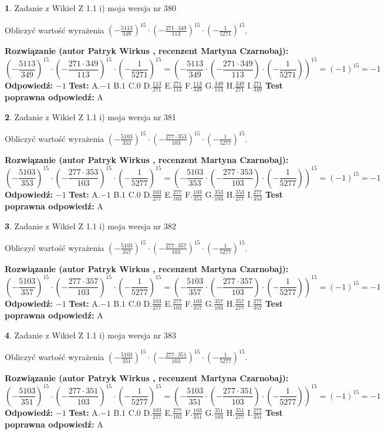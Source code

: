 \documentclass[12pt, a4paper]{article}
\theoremstyle{definition} %
\newtheorem{zad}{}
\newcommand{\zadStart}[1]{\begin{zad}#1\newline}
\newcommand{\zadStop}{\end{zad}}
\newcommand{\rozwStart}[2]{\noindent \textbf{Rozwiązanie (autor #1 , recenzent #2): }\newline}
\newcommand{\rozwStop}{\newline}
\newcommand{\odpStart}{\noindent \textbf{Odpowiedź:}\newline}
\newcommand{\odpStop}{\newline}
\newcommand{\testStart}{\noindent \textbf{Test:}\newline}
\newcommand{\testStop}{\newline}
\newcommand{\kluczStart}{\noindent \textbf{Test poprawna odpowiedź:}\newline}
\newcommand{\kluczStop}{\newline}
\begin{document}
\zadStart{Zadanie z Wikieł Z 1.1 i) moja wersja nr 380}

Obliczyć wartość wyrażenia $(-\frac{5113}{349})^{15} \cdot (-\frac{271 \cdot 349}{113})^{15} \cdot (-\frac{1}{5271})^{15}$.
\zadStop
\rozwStart{Patryk Wirkus}{Martyna Czarnobaj}
$$(-\frac{5113}{349})^{15} \cdot (-\frac{271 \cdot 349}{113})^{15} \cdot (-\frac{1}{5271})^{15} = (-\frac{5113}{349} \cdot (-\frac{271 \cdot 349}{113}) \cdot (-\frac{1}{5271}))^{15} = (-1)^{15} = -1$$
\rozwStop
\odpStart
$-1$
\odpStop
\testStart
A.$-1$ B.$1$ C.$0$ D.$\frac{113}{271}$ E.$\frac{271}{113}$
F.$\frac{113}{349}$ G.$\frac{349}{113}$
H.$\frac{349}{271}$
I.$\frac{271}{349}$
\testStop
\kluczStart
A
\kluczStop



\zadStart{Zadanie z Wikieł Z 1.1 i) moja wersja nr 381}

Obliczyć wartość wyrażenia $(-\frac{5103}{353})^{15} \cdot (-\frac{277 \cdot 353}{103})^{15} \cdot (-\frac{1}{5277})^{15}$.
\zadStop
\rozwStart{Patryk Wirkus}{Martyna Czarnobaj}
$$(-\frac{5103}{353})^{15} \cdot (-\frac{277 \cdot 353}{103})^{15} \cdot (-\frac{1}{5277})^{15} = (-\frac{5103}{353} \cdot (-\frac{277 \cdot 353}{103}) \cdot (-\frac{1}{5277}))^{15} = (-1)^{15} = -1$$
\rozwStop
\odpStart
$-1$
\odpStop
\testStart
A.$-1$ B.$1$ C.$0$ D.$\frac{103}{277}$ E.$\frac{277}{103}$
F.$\frac{103}{353}$ G.$\frac{353}{103}$
H.$\frac{353}{277}$
I.$\frac{277}{353}$
\testStop
\kluczStart
A
\kluczStop



\zadStart{Zadanie z Wikieł Z 1.1 i) moja wersja nr 382}

Obliczyć wartość wyrażenia $(-\frac{5103}{357})^{15} \cdot (-\frac{277 \cdot 357}{103})^{15} \cdot (-\frac{1}{5277})^{15}$.
\zadStop
\rozwStart{Patryk Wirkus}{Martyna Czarnobaj}
$$(-\frac{5103}{357})^{15} \cdot (-\frac{277 \cdot 357}{103})^{15} \cdot (-\frac{1}{5277})^{15} = (-\frac{5103}{357} \cdot (-\frac{277 \cdot 357}{103}) \cdot (-\frac{1}{5277}))^{15} = (-1)^{15} = -1$$
\rozwStop
\odpStart
$-1$
\odpStop
\testStart
A.$-1$ B.$1$ C.$0$ D.$\frac{103}{277}$ E.$\frac{277}{103}$
F.$\frac{103}{357}$ G.$\frac{357}{103}$
H.$\frac{357}{277}$
I.$\frac{277}{357}$
\testStop
\kluczStart
A
\kluczStop



\zadStart{Zadanie z Wikieł Z 1.1 i) moja wersja nr 383}

Obliczyć wartość wyrażenia $(-\frac{5103}{351})^{15} \cdot (-\frac{277 \cdot 351}{103})^{15} \cdot (-\frac{1}{5277})^{15}$.
\zadStop
\rozwStart{Patryk Wirkus}{Martyna Czarnobaj}
$$(-\frac{5103}{351})^{15} \cdot (-\frac{277 \cdot 351}{103})^{15} \cdot (-\frac{1}{5277})^{15} = (-\frac{5103}{351} \cdot (-\frac{277 \cdot 351}{103}) \cdot (-\frac{1}{5277}))^{15} = (-1)^{15} = -1$$
\rozwStop
\odpStart
$-1$
\odpStop
\testStart
A.$-1$ B.$1$ C.$0$ D.$\frac{103}{277}$ E.$\frac{277}{103}$
F.$\frac{103}{351}$ G.$\frac{351}{103}$
H.$\frac{351}{277}$
I.$\frac{277}{351}$
\testStop
\kluczStart
A
\kluczStop
\end{document}
